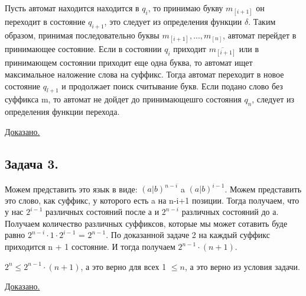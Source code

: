 \documentclass[a4paper,14pt]{article} %
\begin{document}
Пусть автомат находится находится в $q_i$, то принимаю букву $m_{[i+1]}$ он переходит в состояние $q_{i+1}$, это следует из определения функции $\delta$.
Таким образом, принимая последовательно буквы $m_{[i+1]}, ..., m_{[n]}$, автомат перейдет в принимающее состояние.
Если в состоянии $q_i$ приходит $\overline{m_{[i+1]}}$ или в принимающем состоянии приходит еще одна буква, то автомат ищет максимальное наложение слова на суффикс.
Тогда автомат переходит в новое состояние $q_{l+1}$ и продолжает поиск считывание букв. Если подано слово без суффикса m, то автомат не дойдет до принимающешго состояния $q_n$, следует из определения функции перехода.

\underline{Доказано.}

\subsection{Задача 3.}
Можем представить это язык в виде: $(a|b)^{n-i}$ a $(a|b)^{i-1}$.
Можем представить это слово, как суффикс, у которого есть a на n-i+1 позиции. Тогда получаем, что у нас $2^{i-1}$ различных состояний после а и $2^{n-i}$ различных состояний до а.
Получаем количество различных суффиксов, которые мы может сотавить буде равно $2^{n-i} \cdot 1 \cdot 2^{i-1}$ = $2^{n-1}$. По доказанной задаче 2 на каждый суффикс приходится n + 1 состояние.
И тогда получаем $2^{n- 1} \cdot (n+1)$. 

$2^n \leq  2^{n-1} \cdot (n+1)$, а это верно для всех 1 $\leq n$, а это верно из условия задачи. 

\underline{Доказано.}
\end{document}
